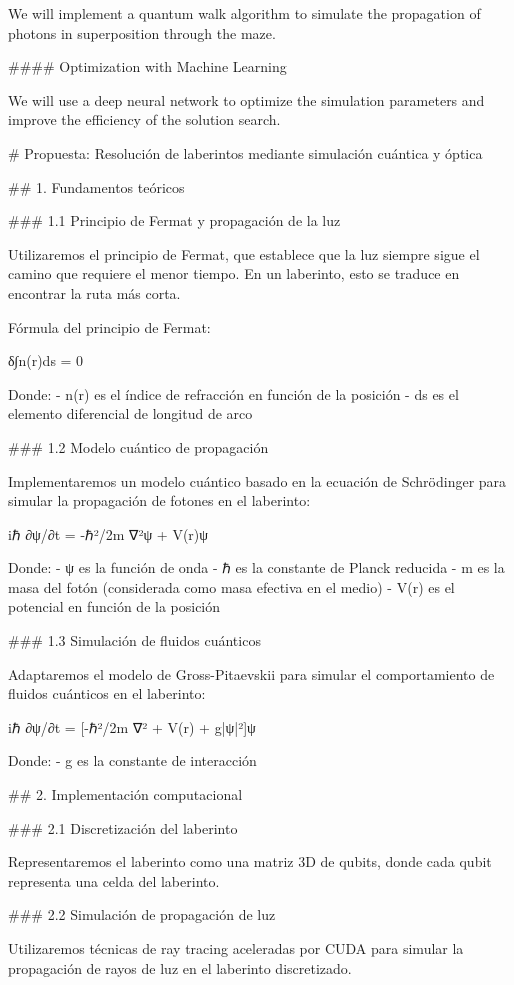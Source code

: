We will implement a quantum walk algorithm to simulate the propagation of photons in superposition through the maze.

#### Optimization with Machine Learning

We will use a deep neural network to optimize the simulation parameters and improve the efficiency of the solution search.

# Propuesta: Resolución de laberintos mediante simulación cuántica y óptica

## 1. Fundamentos teóricos

### 1.1 Principio de Fermat y propagación de la luz

Utilizaremos el principio de Fermat, que establece que la luz siempre sigue el camino que requiere el menor tiempo. En un laberinto, esto se traduce en encontrar la ruta más corta.

Fórmula del principio de Fermat:

δ∫n(r)ds = 0

Donde:
- n(r) es el índice de refracción en función de la posición
- ds es el elemento diferencial de longitud de arco

### 1.2 Modelo cuántico de propagación

Implementaremos un modelo cuántico basado en la ecuación de Schrödinger para simular la propagación de fotones en el laberinto:

iℏ ∂ψ/∂t = -ℏ²/2m ∇²ψ + V(r)ψ

Donde:
- ψ es la función de onda
- ℏ es la constante de Planck reducida
- m es la masa del fotón (considerada como masa efectiva en el medio)
- V(r) es el potencial en función de la posición

### 1.3 Simulación de fluidos cuánticos

Adaptaremos el modelo de Gross-Pitaevskii para simular el comportamiento de fluidos cuánticos en el laberinto:

iℏ ∂ψ/∂t = [-ℏ²/2m ∇² + V(r) + g|ψ|²]ψ

Donde:
- g es la constante de interacción

## 2. Implementación computacional

### 2.1 Discretización del laberinto

Representaremos el laberinto como una matriz 3D de qubits, donde cada qubit representa una celda del laberinto.

### 2.2 Simulación de propagación de luz

Utilizaremos técnicas de ray tracing aceleradas por CUDA para simular la propagación de rayos de luz en el laberinto discretizado.

